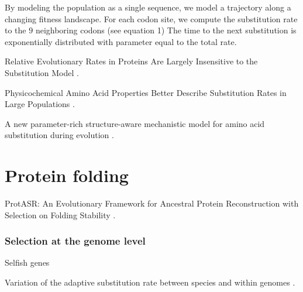 By modeling the population as a single sequence, we model a trajectory along a changing fitness landscape.
For each codon site, we compute the substitution rate to the $9$ neighboring codons (see equation 1)  
The time to the next substitution is exponentially distributed with parameter equal to the total rate.

\citep{Halpern1998a} 

Relative Evolutionary Rates in Proteins Are Largely Insensitive to the Substitution Model \citep{Spielman2018}.

Physicochemical Amino Acid Properties Better Describe Substitution Rates in Large Populations \citep{Weber2019}.

A new parameter-rich structure-aware mechanistic model for amino acid substitution during evolution \citep{Chi2018}.


\section{Protein folding}

ProtASR: An Evolutionary Framework for Ancestral Protein Reconstruction with Selection on Folding Stability \citep{Arenas2017}.


\subsubsection{Selection at the genome level}
Selfish genes

Variation of the adaptive substitution rate between species and within genomes \citep{Moutinho2019}.


